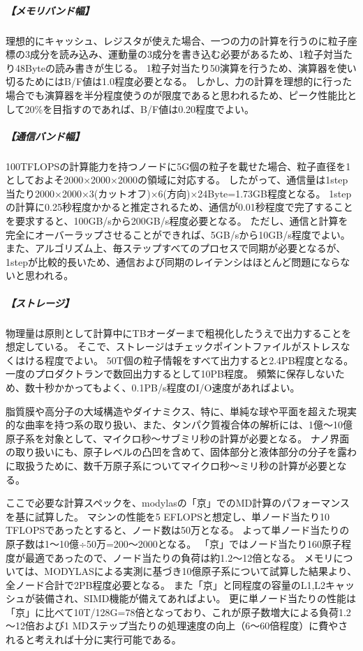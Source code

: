 \subparagraph{【メモリバンド幅】}
理想的にキャッシュ、レジスタが使えた場合、一つの力の計算を行うのに粒子座標の3成分を読み込み、運動量の3成分を書き込む必要があるため、1粒子対当たり48Byteの読み書きが生じる。
1粒子対当たり50演算を行うため、演算器を使い切るためにはB/F値は1.0程度必要となる。
しかし、力の計算を理想的に行った場合でも演算器を半分程度使うのが限度であると思われるため、ピーク性能比として20\%を目指すのであれば、B/F値は0.20程度でよい。

\subparagraph{【通信バンド幅】}
100TFLOPSの計算能力を持つノードに5G個の粒子を載せた場合、粒子直径を1としておよそ2000×2000×2000の領域に対応する。
したがって、通信量は1step当たり2000×2000×3(カットオフ)×6(方向)×24Byte=1.73GB程度となる。
1stepの計算に0.25秒程度かかると推定されるため、通信が0.01秒程度で完了することを要求すると、100GB/sから200GB/s程度必要となる。
ただし、通信と計算を完全にオーバーラップさせることができれば、5GB/sから10GB/s程度でよい。
また、アルゴリズム上、毎ステップすべてのプロセスで同期が必要となるが、1stepが比較的長いため、通信および同期のレイテンシはほとんど問題にならないと思われる。

\subparagraph{【ストレージ】}
物理量は原則として計算中にTBオーダーまで粗視化したうえで出力することを想定している。
そこで、ストレージはチェックポイントファイルがストレスなくはける程度でよい。
50T個の粒子情報をすべて出力すると2.4PB程度となる。
一度のプロダクトランで数回出力するとして10PB程度。
頻繁に保存しないため、数十秒かかってもよく、0.1PB/s程度のI/O速度があればよい。


\label{sec:4-2_要求性能_長距離古典MD}
脂質膜や高分子の大域構造やダイナミクス、特に、単純な球や平面を超えた現実的な曲率を持つ系の取り扱い、また、タンパク質複合体の解析には、1億〜10億原子系を対象として、マイクロ秒〜サブミリ秒の計算が必要となる。
ナノ界面の取り扱いにも、原子レベルの凸凹を含めて、固体部分と液体部分の分子を露わに取扱うために、数千万原子系についてマイクロ秒〜ミリ秒の計算が必要となる。

ここで必要な計算スペックを、modylasの「京」でのMD計算のパフォーマンスを基に試算した。
マシンの性能を5 EFLOPSと想定し、単ノード当たり10 TFLOPSであったとすると、ノード数は50万となる。
よって単ノード当たりの原子数は1～10億÷50万=200～2000となる。
「京」ではノード当たり160原子程度が最適であったので、ノード当たりの負荷は約1.2～12倍となる。
メモリについては、MODYLASによる実測に基づき10億原子系について試算した結果より、全ノード合計で2PB程度必要となる。
また「京」と同程度の容量のL1,L2キャッシュが装備され、SIMD機能が備えてあればよい。
更に単ノード当たりの性能は「京」に比べて10T/128G=78倍となっており、これが原子数増大による負荷1.2～12倍および1 MDステップ当たりの処理速度の向上（6～60倍程度）に費やされると考えれば十分に実行可能である。


